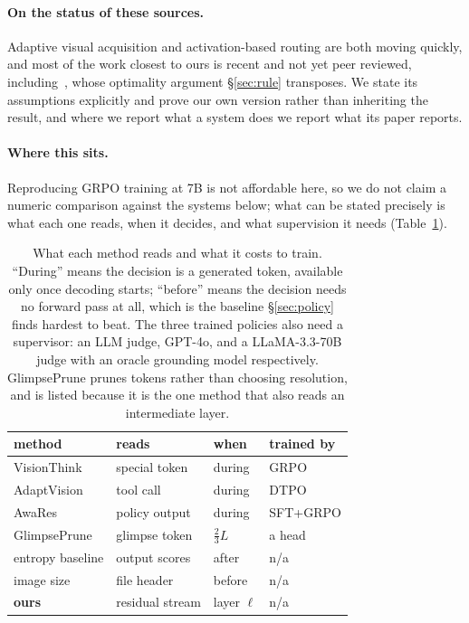 \documentclass[10pt,twocolumn]{article}
\theoremstyle{plain}
\begin{document}
\paragraph{On the status of these sources.} Adaptive visual acquisition and
activation-based routing are both moving quickly, and most of the work closest
to ours is recent and not yet peer reviewed, including~\cite{ucci}, whose
optimality argument \S\ref{sec:rule} transposes. We state its assumptions
explicitly and prove our own version rather than inheriting the result, and
where we report what a system does we report what its paper reports.

\paragraph{Where this sits.} Reproducing GRPO training at 7B is not affordable
here, so we do not claim a numeric comparison against the systems below; what
can be stated precisely is what each one reads, when it decides, and what
supervision it needs (Table~\ref{tab:position}).

\begin{table}[t]
\centering\footnotesize
\setlength{\tabcolsep}{3pt}
\begin{tabular}{@{}llll@{}}
\toprule
method & reads & when & trained by \\
\midrule
VisionThink~\cite{visionthink} & special token & during & GRPO \\
AdaptVision~\cite{adaptvision} & tool call & during & DTPO \\
AwaRes~\cite{awares} & policy output & during & SFT+GRPO \\
GlimpsePrune~\cite{glimpseprune} & glimpse token & $\tfrac{2}{3}L$ & a head \\
\midrule
entropy baseline & output scores & after & n/a \\
image size & file header & before & n/a \\
\textbf{ours} & residual stream & layer $\ell$ & n/a \\
\bottomrule
\end{tabular}
\caption{What each method reads and what it costs to train. ``During'' means the
decision is a generated token, available only once decoding starts; ``before''
means the decision needs no forward pass at all, which is the baseline
\S\ref{sec:policy} finds hardest to beat. The three
trained policies also need a supervisor: an LLM judge, GPT-4o, and a
LLaMA-3.3-70B judge with an oracle grounding model respectively. GlimpsePrune
prunes tokens rather than choosing resolution, and is listed because it is the
one method that also reads an intermediate layer.}
\label{tab:position}
\end{table}
\end{document}
